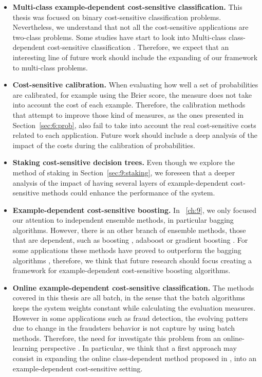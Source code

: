 \begin{itemize}
 \item \textbf{Multi-class example-dependent cost-sensitive classification.} This thesis was 
focused on binary cost-sensitive classification problems. Nevertheless, we understand 
that not all the cost-sensitive applications are two-class problems. Some studies have start to 
look into Multi-class class-dependent cost-sensitive classification \citep{Zhou2010}. Therefore, we 
expect that an interesting line of future work should include the expanding of our framework to 
multi-class problems.

 \item \textbf{Cost-sensitive calibration.} When evaluating how well a set of probabilities are 
calibrated, for example using the Brier score, the measure does not take into account the cost of 
each example. Therefore, the calibration methods that attempt to improve those kind of measures, as 
the ones presented in Section~\ref{sec:6:prob}, also fail to take into account the real 
cost-sensitive costs related to each application. Future work should include a deep analysis of the 
impact of the costs during the calibration of probabilities.

  \item \textbf{Staking cost-sensitive decision trees.} Even though we explore the method of 
staking in Section~\ref{sec:9:staking}, we foreseen that a deeper analysis of the impact of having 
several layers of example-dependent cost-sensitive methods could enhance the performance of the 
system.

  \item \textbf{Example-dependent cost-sensitive boosting.} In \chaptername{~\ref{ch:9}}, we 
only focused our attention to independent ensemble methods, in particular bagging algorithms. 
However, there is an other branch of ensemble methods, those that are dependent, such as 
boosting \citep{Schapire1990}, adaboost \citep{Freund1996} or gradient boosting 
\citep{Friedman2001,Friedman2002}. For some applications these methods have proved to outperform 
the bagging algorithms \citep{Zhou2012}, therefore, we think that future research should focus 
creating a framework for example-dependent cost-sensitive boosting algorithms.

  \item \textbf{Online example-dependent cost-sensitive classification.} The methods covered in 
this thesis are all batch, in the sense that the batch algorithms keeps the system weights constant 
while calculating the evaluation measures. However in some applications such as fraud detection, the 
evolving patters due to change in the fraudsters behavior is not capture by using batch methods. 
Therefore, the need for investigate this problem from an online-learning perspective 
\citep{Pozzolo2014}. In particular, we think that a first approach may consist in expanding the 
online class-dependent method proposed in \citep{Wang2014}, into an example-dependent cost-sensitive 
setting.
\end{itemize}
